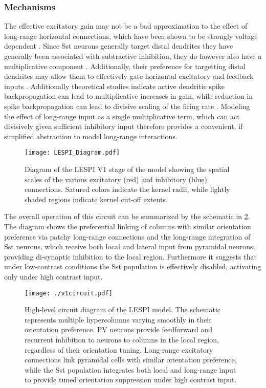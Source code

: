 \subsubsection{Mechanisms}

The effective excitatory gain may not be a bad approximation to the
effect of long-range horizontal connections, which have been shown to
be strongly voltage dependent \citep{Hirsch1991}. Since Sst neurons
generally target distal dendrites they have generally been associated
with subtractive inhibition, they do however also have a
multiplicative component \citep{Wilson2012}. Additionally, their
preference for targetting distal dendrites may allow them to
effectively gate horizontal excitatory and feedback inputs
\citep{Ma2011, Gentet2012}. Additionally theoretical studies indicate
active dendritic spike backpropagation can lead to multiplicative
increases in gain, while reduction in spike backpropagation can lead
to divisive scaling of the firing rate \citep{Mehaffey2005}. Modeling
the effect of long-range input as a single multiplicative term, which
can act divisively given sufficient inhibitory input therefore
provides a convenient, if simplified abstraction to model long-range
interactions.

\begin{figure}
	\centering
        \texttt{[image: LESPI\_Diagram.pdf]}
	\caption{Diagram of the LESPI V1 stage of the model showing the
          spatial scales of the various excitatory (red) and
          inhibitory (blue) connections. Satured colors indicate the
          kernel radii, while lightly shaded regions indicate kernel
          cut-off extents.}
	\label{LESPIDiagram}
\end{figure}

The overall operation of this circuit can be summarized by the
schematic in \ref{circuit_diagram}. The diagram shows the preferential
linking of columns with similar orientation preference via patchy
long-range connections and the long-range integration of Sst neurons,
which receive both local and lateral input from pyramidal neurons,
providing di-synaptic inhibition to the local region. Furthermore it
suggests that under low-contrast conditions the Sst population is
effectively disabled, activating only under high contrast input.

\begin{figure}
	\centering
	\texttt{[image: ./v1circuit.pdf]}
	\caption[High-level circuit diagram of the LESPI
      model.]{High-level circuit diagram of the LESPI model. The
      schematic represents multiple hypercolumns varying smoothly in
      their orientation preference. PV neurons provide feedforward and
      recurrent inhibition to neurons to columns in the local region,
      regardless of their orientation tuning. Long-range excitatory
      connections link pyramidal cells with similar orientation
      preference, while the Sst population integrates both local and
      long-range input to provide tuned orientation suppression under
      high contrast input.}
    \label{circuit_diagram}
\end{figure}

